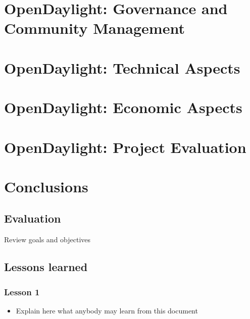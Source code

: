 \documentclass[a4paper, 12pt]{book}
\begin{document}
\chapter{OpenDaylight: Governance and Community Management}
\label{chap:odlcommunity}

\chapter{OpenDaylight: Technical Aspects}
\label{chap:odltechnical}

\chapter{OpenDaylight: Economic Aspects}
\label{chap:odleconomic}

\chapter{OpenDaylight: Project Evaluation}
\label{chap:odlprojeval}


\chapter{Conclusions}
\label{chap:conclusions}


\section{Evaluation}
\label{sec:evaluation}


Review goals and objectives


\section{Lessons learned}
\label{sec:lessons}

\subsection{Lesson 1}
\begin{itemize}
 \item Explain here what anybody may learn from this document
\end{itemize}
\end{document}
